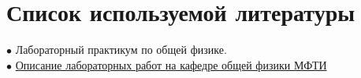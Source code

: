 
\section{Список используемой литературы}

$\bullet$ Лабораторный практикум по общей физике. \labTopic \\

$\bullet$ \href{https://mipt.ru/education/chair/physics/S_III/lab/}{Описание лабораторных работ на кафедре общей физики МФТИ} 
